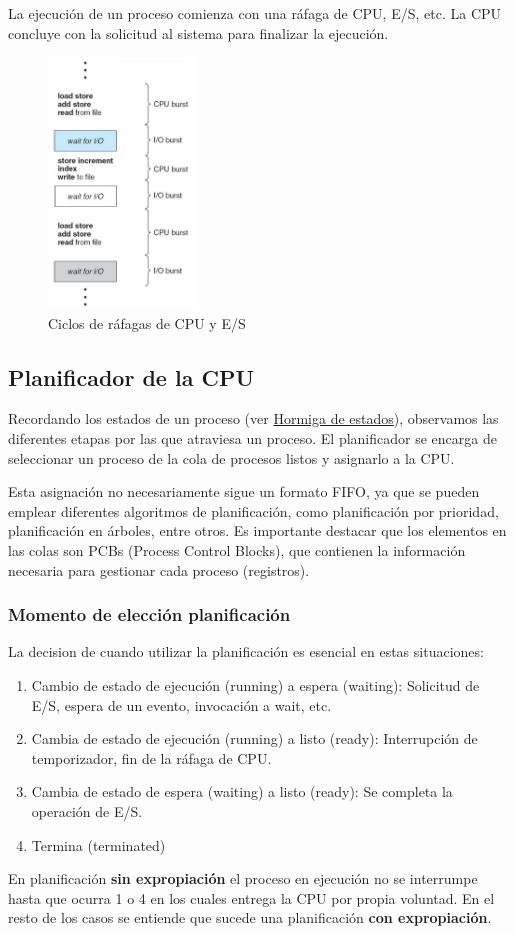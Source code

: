 \documentclass{templateNote}
\begin{document}
La ejecución de un proceso comienza con una ráfaga de CPU, E/S, etc. La CPU concluye con la solicitud al sistema para finalizar la ejecución.

\begin{figure}[H]
    \centering
    \includegraphics[width=0.35\textwidth]{img/rafagas.png}
    \caption{Ciclos de ráfagas de CPU y E/S}
\end{figure}

\subsection*{Planificador de la CPU}
Recordando los estados de un proceso (ver \hyperref[fig:hormiga-estados]{Hormiga de estados}), observamos las diferentes etapas por las que atraviesa un proceso. El planificador se encarga de seleccionar un proceso de la cola de procesos listos y asignarlo a la CPU.

Esta asignación no necesariamente sigue un formato FIFO, ya que se pueden emplear diferentes algoritmos de planificación, como planificación por prioridad, planificación en árboles, entre otros. Es importante destacar que los elementos en las colas son PCBs (Process Control Blocks), que contienen la información necesaria para gestionar cada proceso (registros).

\subsubsection*{Momento de elección planificación}
La decision de cuando utilizar la planificación es esencial en estas situaciones: 
\begin{enumerate}
    \item Cambio de estado de ejecución (running) a espera (waiting): Solicitud de E/S, espera de un evento, invocación a wait, etc.
    \item Cambia de estado de ejecución (running) a listo (ready): Interrupción de temporizador, fin de la ráfaga de CPU.
    \item Cambia de estado de espera (waiting) a listo (ready): Se completa la operación de E/S.
    \item Termina (terminated)
\end{enumerate}
En planificación \textbf{sin expropiación} el proceso en ejecución no se interrumpe hasta que ocurra 1 o 4 en los cuales entrega la CPU por propia voluntad.
En el resto de los casos se entiende que sucede una planificación \textbf{con expropiación}.
\end{document}
